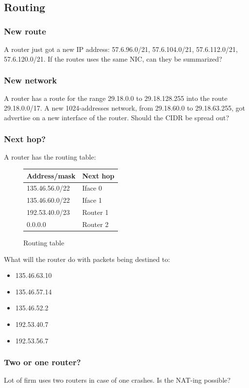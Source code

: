 \documentclass[11pt]{article}
\begin{document}
\subsection{Routing}
\subsubsection{New route}
A router just got a new IP address: 57.6.96.0/21, 57.6.104.0/21, 57.6.112.0/21, 57.6.120.0/21. If the routes uses the same NIC, can they be summarized?%
\subsubsection{New network}
A router has a route for the range 29.18.0.0 to 29.18.128.255 into the route 29.18.0.0/17. A new 1024-addresses network, from 29.18.60.0 to 29.18.63.255, got advertise on a new interface of the router. Should the CIDR be spread out?%
\subsubsection{Next hop?}
A router has the routing table:
  \begin{figure}[h]
  \centering
    \begin{tabular}{ll}
      \textbf{Address/mask} & Next hop \\ \hline
      135.46.56.0/22        & Iface 0  \\
      135.46.60.0/22        & Iface 1  \\
      192.53.40.0/23        & Router 1 \\
      0.0.0.0               & Router 2 \\ \hline
    \end{tabular}
  \caption{Routing table}
  \end{figure}
What will the router do with packets being destined to:
\begin{itemize}
  \item 135.46.63.10  %
  \item 135.46.57.14  %
  \item 135.46.52.2   %
  \item 192.53.40.7   %
  \item 192.53.56.7   %
\end{itemize}
\subsubsection{Two or one router?}
Lot of firm uses two routers in case of one crashes. Is the NAT-ing possible?
\end{document}
